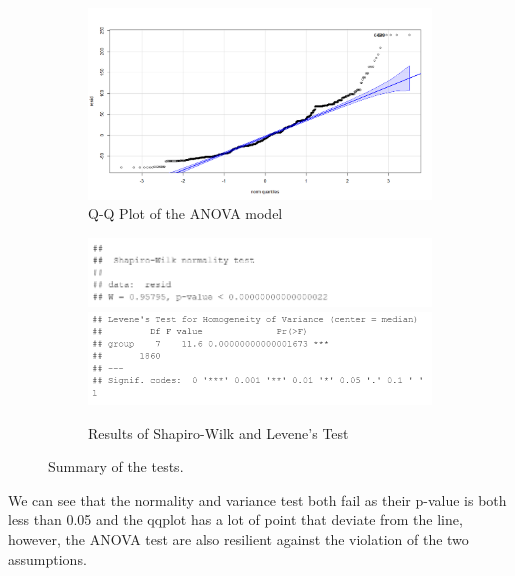 \begin{figure}[H]
    \centering
    \begin{subfigure}[b]{0.35\textwidth}
        \centering
        \includegraphics[width=\textwidth]{./graphics/QQplot_resid_litho.png}
        \caption{Q-Q Plot of the ANOVA model}
        \label{fig:anova_litho_shapiro_wilk}
    \end{subfigure}
    \begin{subfigure}[b]{0.6\textwidth}
        \centering
        \includegraphics[width=\textwidth]{graphics/shapiro.png}
        \includegraphics[width=\textwidth]{graphics/levent.png}
        \caption{Results of Shapiro-Wilk and Levene's Test}
        \label{fig:anova_litho_shapiro_wilk}
    \end{subfigure}
    \caption{Summary of the tests.}
\end{figure}

We can see that the normality and variance test both fail as their p-value is both less than 0.05 and the qqplot has a lot of point that deviate from the line, however, the ANOVA test are also resilient against the violation of the two assumptions\cite{tukey}. 

